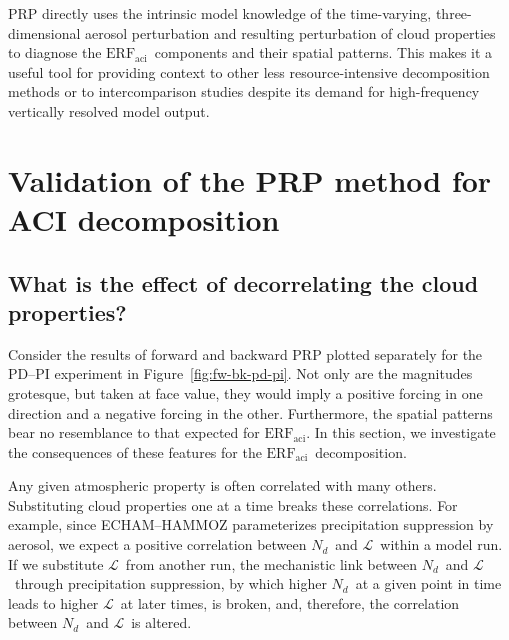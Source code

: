 \documentclass[acp, manuscript]{copernicus}\usepackage[]{graphicx}\usepackage[]{color}
\newcommand\nd{\ensuremath{N_d}}
\newcommand\lwp{\ensuremath{\mathcal L}}
\newcommand\erfaci{\ensuremath{\text{ERF}_\text{aci}}}
\begin{document}
PRP directly uses the intrinsic model knowledge of the time-varying,
three-dimensional aerosol perturbation and resulting perturbation of cloud
properties to diagnose the \erfaci\ components and their
spatial patterns.  This makes it a useful tool for providing
context to other less resource-intensive decomposition methods \citep[e.g.,][]{Ghan2016,
  Gryspeerdt2019b} or to intercomparison studies \citep[e.g.,][]{Pincus2016,
  Smith2018} despite its demand for high-frequency vertically resolved model
output.

\appendix

\section{Validation of the PRP method for ACI decomposition}

\subsection{What is the effect of decorrelating the cloud properties?}
\label{sec:decorr}

Consider the results of forward and backward PRP plotted separately for the
PD--PI experiment in Figure~\ref{fig:fw-bk-pd-pi}.  Not only are the magnitudes
grotesque, but taken at face value, they would imply a positive forcing in one
direction and a negative forcing in the other.  Furthermore, the spatial
patterns bear no resemblance to that expected for \erfaci.  In this section, we
investigate the consequences of these features for the \erfaci\ decomposition.

Any given atmospheric property is often correlated with many others.
Substituting cloud properties one at a time breaks these correlations.  For
example, since ECHAM--HAMMOZ parameterizes precipitation suppression by aerosol, we
expect a positive correlation between \nd\ and \lwp\ within a model run.  If we
substitute \lwp\ from another run, the mechanistic link between \nd\ and \lwp\
through precipitation suppression, by which higher \nd\ at a given point in time
leads to higher \lwp\ at later times, is broken, and, therefore, the correlation
between \nd\ and \lwp\ is altered.
\end{document}
